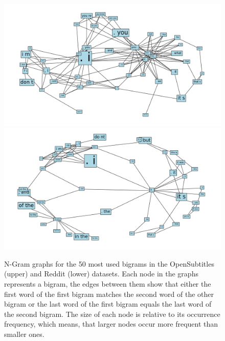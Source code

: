 \begin{figure}[H]
	\includegraphics[width=\linewidth]{img/opensubtitles_bigram_top_50_graph}
	\centering
	\small
	\endminipage\hfill
	\includegraphics[width=\linewidth]{img/reddit_bigram_top_50_graph}
	\centering
	\small
	\endminipage\hfill
	\caption{N-Gram graphs for the 50 most used bigrams in the OpenSubtitles (upper) and Reddit (lower) datasets. Each node in the graphs represents a bigram, the edges between them show that either the first word of the first bigram matches the second word of the other bigram or the last word of the first bigram equals the last word of the second bigram. The size of each node is relative to its occurrence frequency, which means, that larger nodes occur more frequent than smaller ones.}
	\label{data:ngram:graph_top_50}
\end{figure}

